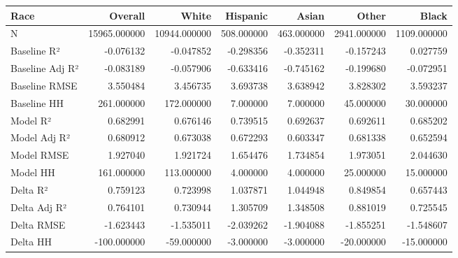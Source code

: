 \begin{tabular}{lrrrrrr}
\toprule
Race &       Overall &         White &    Hispanic &       Asian &        Other &        Black \\
\midrule
N               &  15965.000000 &  10944.000000 &  508.000000 &  463.000000 &  2941.000000 &  1109.000000 \\
Baseline R²     &     -0.076132 &     -0.047852 &   -0.298356 &   -0.352311 &    -0.157243 &     0.027759 \\
Baseline Adj R² &     -0.083189 &     -0.057906 &   -0.633416 &   -0.745162 &    -0.199680 &    -0.072951 \\
Baseline RMSE   &      3.550484 &      3.456735 &    3.693738 &    3.638942 &     3.828302 &     3.593237 \\
Baseline HH     &    261.000000 &    172.000000 &    7.000000 &    7.000000 &    45.000000 &    30.000000 \\
Model R²        &      0.682991 &      0.676146 &    0.739515 &    0.692637 &     0.692611 &     0.685202 \\
Model Adj R²    &      0.680912 &      0.673038 &    0.672293 &    0.603347 &     0.681338 &     0.652594 \\
Model RMSE      &      1.927040 &      1.921724 &    1.654476 &    1.734854 &     1.973051 &     2.044630 \\
Model HH        &    161.000000 &    113.000000 &    4.000000 &    4.000000 &    25.000000 &    15.000000 \\
Delta R²        &      0.759123 &      0.723998 &    1.037871 &    1.044948 &     0.849854 &     0.657443 \\
Delta Adj R²    &      0.764101 &      0.730944 &    1.305709 &    1.348508 &     0.881019 &     0.725545 \\
Delta RMSE      &     -1.623443 &     -1.535011 &   -2.039262 &   -1.904088 &    -1.855251 &    -1.548607 \\
Delta HH        &   -100.000000 &    -59.000000 &   -3.000000 &   -3.000000 &   -20.000000 &   -15.000000 \\
\bottomrule
\end{tabular}
